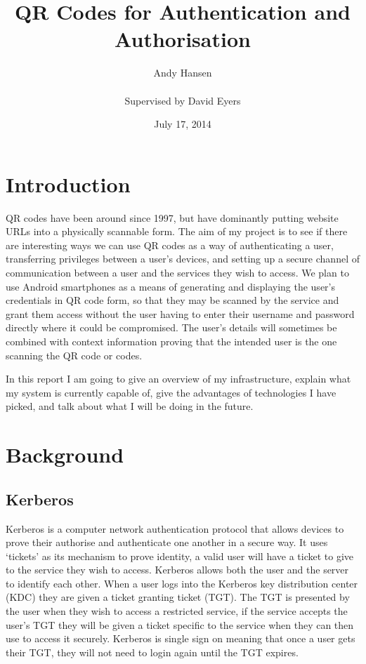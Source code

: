 \documentclass[]{report}   %
\begin{document}
\title{QR Codes for Authentication and Authorisation}
\author{Andy Hansen\\\\
Supervised by David Eyers} 
\date{July 17, 2014} 
\maketitle
\tableofcontents

\section{Introduction}
QR codes have been around since 1997, but have dominantly putting website URLs into a physically scannable form. The aim of my project is to see if there are interesting ways we can use QR codes as a way of authenticating a user, transferring privileges between a user's devices, and setting up a secure channel of communication between a user and the services they wish to access. We plan to use Android smartphones as a means of generating and displaying the user's credentials in QR code form, so that they may be scanned by the service and grant them access without the user having to enter their username and password directly where it could be compromised. The user's details will sometimes be combined with context information proving that the intended user is the one scanning the QR code or codes.

In this report I am going to give an overview of my infrastructure, explain what my system is currently capable of, give the advantages of technologies I have picked, and talk about what I will be doing in the future.

\section{Background}    
\subsection{Kerberos}   
Kerberos \cite{Kerb} is a computer network authentication protocol that allows devices to prove their authorise and authenticate one another in a secure way. It uses ‘tickets’ as its mechanism to prove identity, a valid user will have a ticket to give to the service they wish to access. Kerberos allows both the user and the server to identify each other. When a user logs into the Kerberos key distribution center (KDC) they are given a ticket granting ticket (TGT). The TGT is presented by the user when they wish to access a restricted service, if the service accepts the user's TGT they will be given a ticket specific to the service when they can then use to access it securely. Kerberos is single sign on meaning that once a user gets their TGT, they will not need to login again until the TGT expires.
\end{document}

